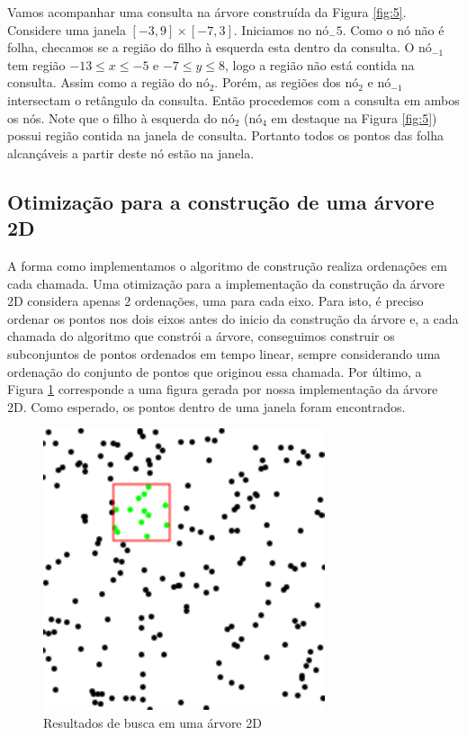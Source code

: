 Vamos acompanhar uma consulta na árvore construída da Figura \ref{fig:5}. Considere uma janela $[-3, 9]\times[-7, 3]$. %
Iniciamos no nó$_-5$. Como o nó não é folha, checamos se a região do filho à esquerda esta dentro da consulta. O $\mbox{nó}_{-1}$ tem região $ -13 \leq x \leq -5 $ e  $ -7 \leq y \leq 8$, logo a região não está contida na consulta. Assim como a região do nó$_2$. Porém, as regiões dos $\mbox{nó}_2$ e $\mbox{nó}_{-1}$ intersectam o retângulo da consulta. Então procedemos com a consulta em ambos os nós. %
Note que o filho à esquerda do $\mbox{nó}_{2}$ ($\mbox{nó}_4$ em destaque na Figura \ref{fig:5}) possui região contida na janela de consulta. Portanto todos os pontos das folha alcançáveis a partir deste nó estão na janela. 

\subsection{Otimização para a construção de uma árvore 2D}
A forma como implementamos o algoritmo de construção realiza ordenações em cada chamada.
Uma otimização para a implementação da construção da árvore 2D considera apenas 2 ordenações, uma para cada eixo. %
Para isto, é preciso ordenar os pontos nos dois eixos antes do inicio da construção da árvore e, a cada chamada do algoritmo que constrói a árvore, conseguimos construir os subconjuntos de pontos ordenados em tempo linear, sempre considerando uma ordenação do conjunto de pontos que originou essa chamada. %
Por último, a Figura \ref{fig:7} corresponde a uma figura gerada por nossa implementação da árvore 2D. Como esperado, os pontos dentro de uma janela foram encontrados.
\begin{figure}[ht!]
    \begin{center}
        \includegraphics{images/points.pdf}
    \end{center}
    \caption {Resultados de busca em uma árvore 2D}
    \label{fig:7}
\end{figure}

